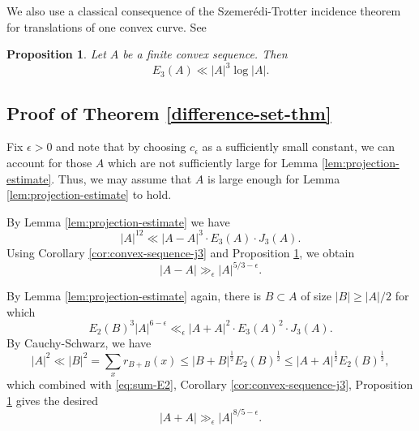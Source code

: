 \documentclass{amsart}
\numberwithin{equation}{section}
\newtheorem{proposition}[theorem]{Proposition}
\newcommand{\e}{\epsilon}
\begin{document}
We also use a classical consequence of the Szemer\'edi-Trotter incidence theorem for translations of one convex curve.
See \cite[Corollary 5]{Schoen-Shkredov}
\begin{proposition}\label{prop:sharp-e3}
Let \(A\) be a finite convex sequence. 
Then
\[
    E_3(A) \ll \left\lvert A \right\rvert ^{3}  \log \left\lvert A \right\rvert.
\]
\end{proposition}



\medskip 

\subsection{Proof of Theorem \ref{difference-set-thm}}

Fix \(\e > 0\) and note that by choosing \(c_{\e} \) as a sufficiently small constant, we can account for those \(A\) which are not sufficiently large for Lemma \ref{lem:projection-estimate}. Thus, we may assume that \(A\) is large enough for Lemma \ref{lem:projection-estimate} to hold.

By Lemma \ref{lem:projection-estimate} we have
\[
\left\lvert A \right\rvert ^{12} \ll \left\lvert A-A \right\rvert ^{3}  \cdot E_3(A) \cdot J_3(A)
.\]
Using Corollary \ref{cor:convex-sequence-j3} and Proposition \ref{prop:sharp-e3}, we obtain
\[
\left\lvert A-A \right\rvert \gg _{\e} \left\lvert A \right\rvert ^{5 /3 - \e}
.\]

By Lemma \ref{lem:projection-estimate} again, there is \(B \subset A\) of size \(\left\lvert B \right\rvert \geq \left\lvert A \right\rvert / 2\) for which
\[
E_2(B)^{3} \left\lvert A \right\rvert ^{6 - \e}\ll _{\e}  \left\lvert A+A \right\rvert ^{2} \cdot E_3(A) ^{2} \cdot J_3(A)
.\]
By Cauchy-Schwarz, we have
\[
\left\lvert A \right\rvert ^{2} \ll \left\lvert B \right\rvert ^{2} = \sum _{x} r_{B + B} (x) \leq \left\lvert B+B \right\rvert ^{\frac{1}{2} } E_2(B) ^{\frac{1}{2} } \leq \left\lvert A+A \right\rvert ^{\frac{1}{2} } E_2(B) ^{\frac{1}{2} }
,\]
which combined with \eqref{eq:sum-E2}, Corollary \ref{cor:convex-sequence-j3}, Proposition \ref{prop:sharp-e3} gives the desired
\[
\left\lvert A + A \right\rvert \gg _{\e}  \left\lvert A \right\rvert ^{8 / 5 - \e}. 
\]






\bigskip




\end{document}
